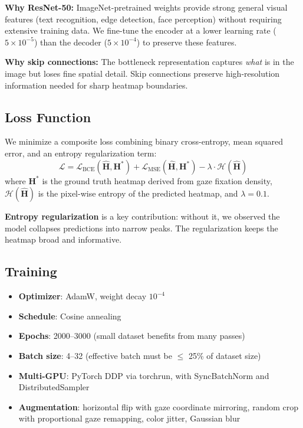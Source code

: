 \documentclass{article}
\begin{document}
\textbf{Why ResNet-50:} ImageNet-pretrained weights provide strong general visual features (text recognition, edge detection, face perception) without requiring extensive training data. We fine-tune the encoder at a lower learning rate ($5 \times 10^{-5}$) than the decoder ($5 \times 10^{-4}$) to preserve these features.

\textbf{Why skip connections:} The bottleneck representation captures \textit{what} is in the image but loses fine spatial detail. Skip connections preserve high-resolution information needed for sharp heatmap boundaries.

\subsection{Loss Function}

We minimize a composite loss combining binary cross-entropy, mean squared error, and an entropy regularization term:
\begin{equation}
    \mathcal{L} = \mathcal{L}_{\text{BCE}}(\hat{\mathbf{H}}, \mathbf{H}^*) + \mathcal{L}_{\text{MSE}}(\hat{\mathbf{H}}, \mathbf{H}^*) - \lambda \cdot \mathcal{H}(\hat{\mathbf{H}})
\end{equation}
where $\mathbf{H}^*$ is the ground truth heatmap derived from gaze fixation density, $\mathcal{H}(\hat{\mathbf{H}})$ is the pixel-wise entropy of the predicted heatmap, and $\lambda = 0.1$.

\textbf{Entropy regularization} is a key contribution: without it, we observed the model collapses predictions into narrow peaks. The regularization keeps the heatmap broad and informative.

\subsection{Training}

\begin{itemize}
    \item \textbf{Optimizer}: AdamW, weight decay $10^{-4}$
    \item \textbf{Schedule}: Cosine annealing
    \item \textbf{Epochs}: 2000--3000 (small dataset benefits from many passes)
    \item \textbf{Batch size}: 4--32 (effective batch must be $\leq$ 25\% of dataset size)
    \item \textbf{Multi-GPU}: PyTorch DDP via torchrun, with SyncBatchNorm and DistributedSampler
    \item \textbf{Augmentation}: horizontal flip with gaze coordinate mirroring, random crop with proportional gaze remapping, color jitter, Gaussian blur
\end{itemize}
\end{document}
